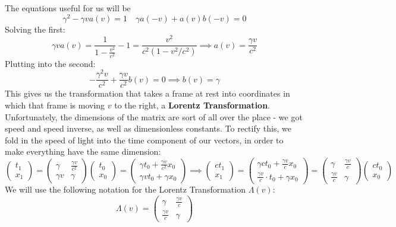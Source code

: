 The equations useful for us will be 
\[
    \gamma^2 - \gamma v a(v) = 1 \quad \gamma a(-v) + a(v) b(-v) = 0 
\]
Solving the first: 
\[
    \gamma v a(v) = \frac{1}{1 - \frac{v^2}{c^2}} - 1 = \frac{v^2}{c^2(1 - v^2/c^2)} \implies a(v) = \frac{\gamma v}{c^2}
\]
Plutting into the second: 
\[
    -\frac{\gamma^2 v}{c^2} + \frac{\gamma v}{c^2} b(v) = 0 \implies b(v) = \gamma 
\]  
This gives us the transformation that takes a frame at rest into coordinates in which that frame is moving $v$ to the right, a \textbf{Lorentz Transformation}.
Unfortunately, the dimensions of the matrix are sort of all over the place - we got speed and speed inverse, as well as dimensionless constants. To rectify this, we fold in the speed of light into the time component of our vectors, in order to make everything have the same dimension: 
\[
    \begin{pmatrix} 
    t_1 \\ x_1
    \end{pmatrix} = \begin{pmatrix}
    \gamma & \frac{\gamma v}{c^2} \\ \gamma v & \gamma
    \end{pmatrix}\begin{pmatrix} 
    t_0 \\ x_0
    \end{pmatrix} = \begin{pmatrix}
    \gamma t_0 + \frac{\gamma v}{c^2}x_0 \\ \gamma v t_0 + \gamma x_0
    \end{pmatrix} \implies \begin{pmatrix} 
    ct_1 \\ x_1
    \end{pmatrix} = \begin{pmatrix}
    \gamma c t_0 + \frac{\gamma v}{c}x_0 \\ \frac{\gamma v}{c} \cdot t_0 + \gamma x_0 \end{pmatrix}= \begin{pmatrix}
    \gamma & \frac{\gamma v}{c} \\ \frac{\gamma v}{c} & \gamma
    \end{pmatrix}\begin{pmatrix} 
    ct_0 \\ x_0
    \end{pmatrix}
\]
We will use the following notation for the Lorentz Transformation $\Lambda (v)$:
\[
    \Lambda (v) = \begin{pmatrix}
    \gamma & \frac{\gamma v}{c} \\ \frac{\gamma v}{c} & \gamma
    \end{pmatrix}
\]

